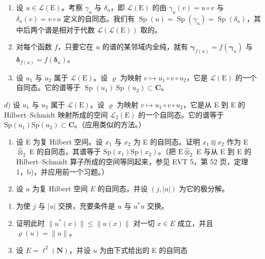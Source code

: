 \begin{enumerate}
\def\labelenumi{\alph{enumi})}
\item
  设 \(u \in \mathcal{L}(\mathrm{E})\)。考察 \(\gamma_{u}\) 与 \(\delta_{u}\)，即 \(\mathcal{L}(\mathrm{E})\) 的由 \(\gamma_{u}(v) = u \circ v\) 与 \(\delta_{u}(v) = v \circ u\) 定义的自同态。我们有 \(\operatorname{Sp}(u) = \operatorname{Sp}(\gamma_{u}) = \operatorname{Sp}(\delta_{u})\)，其中后两个谱是相对于代数 \(\mathcal{L}(\mathcal{L}(\mathrm{E}))\) 取的。
\item
  对每个函数 \(f\)，只要它在 \(u\) 的谱的某邻域内全纯，就有 \(\boldsymbol{\gamma}_{f(u)} = f(\boldsymbol{\gamma}_{u})\) 与 \(\boldsymbol{\delta}_{f(u)} = f(\boldsymbol{\delta}_{u})\)。
\item
  设 \(u_{1}\) 与 \(u_{2}\) 属于 \(\mathcal{L}(\mathrm{E})\)。设 \(\varrho\) 为映射 \(v \mapsto u_{1} \circ v \circ u_{2}\)，它是 \(\mathcal{L}(\mathrm{E})\) 的一个自同态。它的谱等于 \(\operatorname{Sp}(u_{1})\operatorname{Sp}(u_{2}) \subset \mathbf{C}\)。
\end{enumerate}

\(d)\) 设 \(u_{1}\) 与 \(u_{2}\) 属于 \(\mathcal{L}(\mathrm{E})\)。设 \(\varrho\) 为映射 \(v \mapsto u_{1} \circ v \circ u_{2}\)，它是从 E 到 E 的 Hilbert--Schmidt 映射所成的空间 \(\mathcal{L}_{2}(\mathrm{E})\) 的一个自同态。它的谱等于 \(\mathrm{Sp}(u_{1})\mathrm{Sp}(u_{2}) \subset \mathbf{C}\)。（应用类似的方法。）

\begin{enumerate}
\def\labelenumi{\arabic{enumi})}
\setcounter{enumi}{9}
\item
  设 E 为复 Hilbert 空间。设 \(x_1\) 与 \(x_2\) 为 E 的自同态。证明 \(x_1 \otimes x_2\) 作为 E \(\widehat{\otimes}_2\) E 的自同态，其谱等于 \(\mathrm{Sp}(x_1) \mathrm{Sp}(x_2)\)。（把 \(\overline{\mathrm{E}} \widehat{\otimes}_2\) E 与从 E 到 E 的 Hilbert--Schmidt 算子所成的空间等同起来，参见 EVT 5，第 52 页，定理 1，b)，并应用前一个习题。）
\item
  设 \(u\) 为复 Hilbert 空间 \(E\) 的自同态，并设 \((j, |u|)\) 为它的极分解。
\end{enumerate}

\begin{enumerate}
\def\labelenumi{\alph{enumi})}
\item
  为使 \(j\) 与 \(|u|\) 交换，充要条件是 \(u\) 与 \(u^{*}u\) 交换。
\item
  证明此时 \(\|u^{*}(x)\|\leqslant\|u(x)\|\) 对一切 \(x\in E\) 成立，并且 \(\varrho(u)=\|u\|\)。
\item
  设 \(E = \ell^{2}(\mathbf{N})\)，并设 \(u\) 为由下式给出的 E 的自同态
\end{enumerate}

